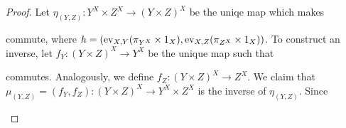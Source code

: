 \begin{solution}
\begin{exercises}
        \item\begin{proof}
            Let $\eta_{(Y,Z)}\colon Y^X\times Z^X\to (Y\times Z)^X$ be the uniqe map which makes
            \begin{center}
            \end{center}
            commute, where $h=\left(\operatorname{ev}_{X,Y}(\pi_{Y^X}\times 1_X),\operatorname{ev}_{X,Z}(\pi_{Z^X}\times 1_X)\right)$.
            To construct an inverse, let $f_Y\colon (Y\times Z)^X\to Y^X$ be the unique map such that
            \begin{center}
            \end{center}
            commutes. Analogously, we define $f_Z\colon(Y\times Z)^X\to Z^X$. 
            We claim that  $\mu_{(Y,Z)}=(f_Y, f_Z)\colon (Y\times Z)^X\to Y^X\times Z^X$ is the inverse of $\eta_{(Y,Z)}$.
            Since
            \begin{center}
\end{center}
\end{proof}
\end{exercises}
\end{solution}
